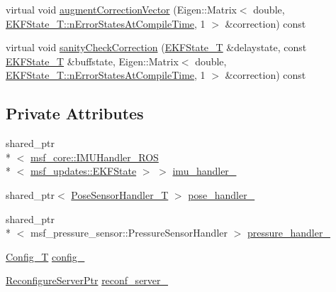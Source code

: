 \begin{DoxyCompactItemize}
virtual void \hyperlink{classmsf__pose__pressure__sensor_1_1PosePressureSensorManager_a057fbd1c8abfe8aea8749d25401f4f36}{augment\-Correction\-Vector} (Eigen\-::\-Matrix$<$ double, \hyperlink{structmsf__core_1_1GenericState__T_a20545d9aacd8f84bc1a97a873310cd5fab0136c5805e4e8d75677885fcaad5901}{E\-K\-F\-State\-\_\-\-T\-::n\-Error\-States\-At\-Compile\-Time}, 1 $>$ \&correction) const 
\item 
virtual void \hyperlink{classmsf__pose__pressure__sensor_1_1PosePressureSensorManager_aa446db754c58c74d15cfeccdbfe8c660}{sanity\-Check\-Correction} (\hyperlink{classmsf__pose__pressure__sensor_1_1PosePressureSensorManager_aa1bbb3e013d34230c78f161de7a0982f}{E\-K\-F\-State\-\_\-\-T} \&delaystate, const \hyperlink{classmsf__pose__pressure__sensor_1_1PosePressureSensorManager_aa1bbb3e013d34230c78f161de7a0982f}{E\-K\-F\-State\-\_\-\-T} \&buffstate, Eigen\-::\-Matrix$<$ double, \hyperlink{structmsf__core_1_1GenericState__T_a20545d9aacd8f84bc1a97a873310cd5fab0136c5805e4e8d75677885fcaad5901}{E\-K\-F\-State\-\_\-\-T\-::n\-Error\-States\-At\-Compile\-Time}, 1 $>$ \&correction) const 
\end{DoxyCompactItemize}
\subsection*{Private Attributes}
\begin{DoxyCompactItemize}
\item 
shared\-\_\-ptr\\*
$<$ \hyperlink{classmsf__core_1_1IMUHandler__ROS}{msf\-\_\-core\-::\-I\-M\-U\-Handler\-\_\-\-R\-O\-S}\\*
$<$ \hyperlink{namespacemsf__updates_a03b0801c76b7400623b00ad4d28f9bcc}{msf\-\_\-updates\-::\-E\-K\-F\-State} $>$ $>$ \hyperlink{classmsf__pose__pressure__sensor_1_1PosePressureSensorManager_ab164531d8fabe379934755b8e47af6d6}{imu\-\_\-handler\-\_\-}
\item 
shared\-\_\-ptr$<$ \hyperlink{classmsf__pose__pressure__sensor_1_1PosePressureSensorManager_a7029a392dc94b00bc153133755f3d410}{Pose\-Sensor\-Handler\-\_\-\-T} $>$ \hyperlink{classmsf__pose__pressure__sensor_1_1PosePressureSensorManager_a816ac164e13bf438e97e9c53b04e005c}{pose\-\_\-handler\-\_\-}
\item 
shared\-\_\-ptr\\*
$<$ msf\-\_\-pressure\-\_\-sensor\-::\-Pressure\-Sensor\-Handler $>$ \hyperlink{classmsf__pose__pressure__sensor_1_1PosePressureSensorManager_ad22ab835dc01d7db1329346c2096f58d}{pressure\-\_\-handler\-\_\-}
\item 
\hyperlink{namespacemsf__pose__pressure__sensor_a2c4cfe42f9dab2046f445854ea6e36b8}{Config\-\_\-\-T} \hyperlink{classmsf__pose__pressure__sensor_1_1PosePressureSensorManager_a3037b2fac735b47ed128abacfe2c2fc5}{config\-\_\-}
\item 
\hyperlink{namespacemsf__pose__pressure__sensor_a76e4a89437dafa8944e50322b9d93903}{Reconfigure\-Server\-Ptr} \hyperlink{classmsf__pose__pressure__sensor_1_1PosePressureSensorManager_af90a82084bb24c132e6764f2f1b1c93e}{reconf\-\_\-server\-\_\-}
\end{DoxyCompactItemize}

